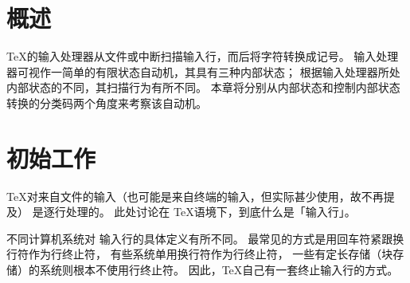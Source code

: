 \documentclass{book}
\begin{document}
\section{概述}

\TeX 的输入处理器从文件或中断扫描输入行，而后将字符转换成记号。
输入处理器可视作一简单的有限状态自动机，其具有三种内部状态；
根据输入处理器所处内部状态的不同，其扫描行为有所不同。
本章将分别从内部状态和控制内部状态转换的分类码两个角度来考察该自动机。

\section{初始工作}

\TeX 对来自文件的输入（也可能是来自终端的输入，但实际甚少使用，故不再提及）
是逐行处理的。
此处讨论在 \TeX 语境下，到底什么是「输入行」。

不同计算机系统对%
%
输入行的具体定义有所不同。
最常见的方式是用回车符紧跟换行符作为行终止符，
有些系统单用换行符作为行终止符，
一些有定长存储（块存储）的系统则根本不使用行终止符。
因此，\TeX 自己有一套终止输入行的方式。
\end{document}
